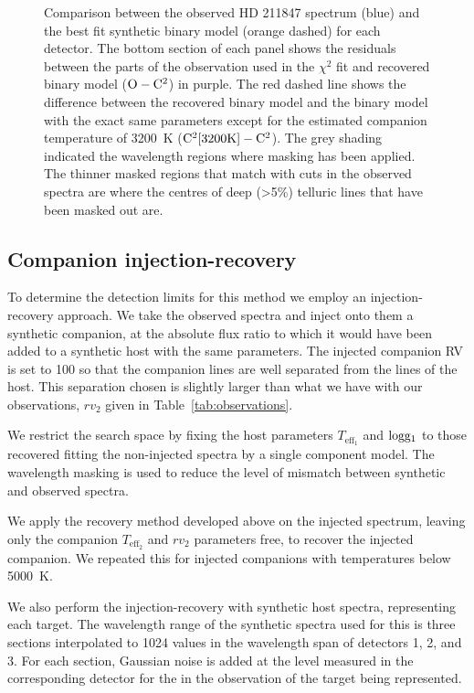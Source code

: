 \begin{figure*}
    \centering
    \caption{Comparison between the observed {HD 211847} spectrum (blue) and the best fit synthetic binary model (orange dashed) for each detector. The bottom section of each panel shows the residuals between the parts of the observation used in the \(\chi^2\) fit and recovered binary model (\(\rm O-C^2\)) in purple. The red dashed line shows the difference between the recovered binary model and the binary model with the exact same parameters except for the estimated companion temperature of 3200~K (\(\rm C^2[3200K]- C^2\)). The grey shading indicated the wavelength regions where masking has been applied. The thinner masked regions that match with cuts in the observed spectra are where the centres of deep (>5\%) telluric lines that have been masked out are.}
    \label{fig:visualinspection-hd2118471}
\end{figure*}


\subsection{Companion injection-recovery}
\label{subsection:injection-recovery}
To determine the detection limits for this method we employ an injection-recovery approach. We take the observed spectra and inject onto them a synthetic companion, at the absolute flux ratio to which it would have been added to a synthetic host with the same parameters. The injected companion RV is set to 100\kmps{} so that the companion lines are well separated from the lines of the host. This separation chosen is slightly larger than what we have with our observations, \(rv_2\) given in Table~\ref{tab:observations}.

We restrict the search space by fixing the host parameters \(T_{\textrm{eff}_1}\) and \(\rm logg_1\) to those recovered fitting the non-injected spectra by a single component model. The wavelength masking is used to reduce the level of mismatch between synthetic and observed spectra. 

We apply the recovery method developed above on the injected spectrum, leaving only the companion \(T_{\textrm{eff}_2}\) and \({rv}_2\) parameters free, to recover the injected companion. We repeated this for injected companions with temperatures below 5000~K. 

We also perform the injection-recovery with synthetic host spectra, representing each target. The wavelength range of the synthetic spectra used for this is three sections interpolated to 1024 values in the wavelength span of detectors 1, 2, and 3. For each section, Gaussian noise is added at the level measured in the corresponding detector for the in the observation of the target being represented.

